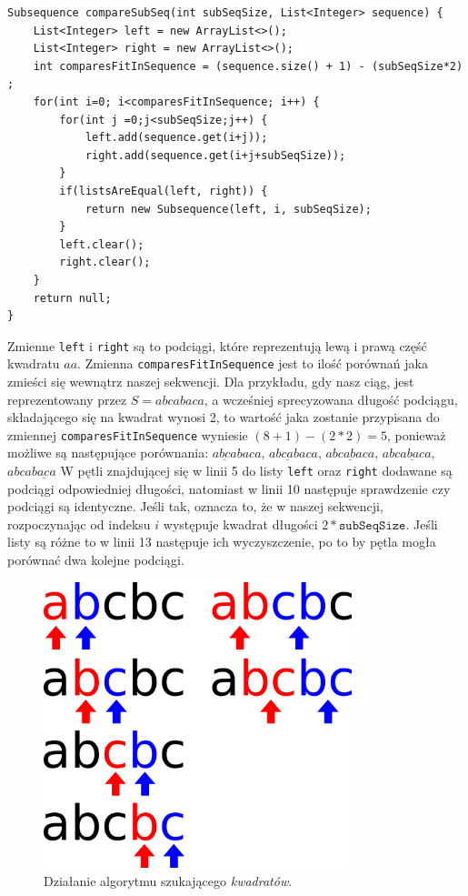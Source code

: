 \documentclass[document]{xmgr}
\begin{document}
\begin{lstlisting}[frame=single]
Subsequence compareSubSeq(int subSeqSize, List<Integer> sequence) {
	List<Integer> left = new ArrayList<>();
	List<Integer> right = new ArrayList<>();
	int comparesFitInSequence = (sequence.size() + 1) - (subSeqSize*2) ;
	for(int i=0; i<comparesFitInSequence; i++) {
		for(int j =0;j<subSeqSize;j++) {
			left.add(sequence.get(i+j));
			right.add(sequence.get(i+j+subSeqSize));
		}
		if(listsAreEqual(left, right)) {
			return new Subsequence(left, i, subSeqSize);
		}
		left.clear();
		right.clear();
	}
	return null;
}
\end{lstlisting}
Zmienne \texttt{left} i \texttt{right} są to podciągi, które reprezentują lewą i prawą część kwadratu $aa$. Zmienna \texttt{comparesFitInSequence} jest to ilość porównań jaka zmieści się wewnątrz naszej sekwencji. Dla przykładu, gdy nasz ciąg, jest reprezentowany przez $S = abcabaca$, a wcześniej sprecyzowana długość podciągu, składającego się na kwadrat wynosi 2, to wartość jaka zostanie przypisana do zmiennej \mbox{\texttt{comparesFitInSequence}} wyniesie $(8 + 1) - (2 * 2)=5$, ponieważ możliwe są następujące porównania: $\underline{abca}baca$, $a\underline{bcab}aca$, $ab\underline{caba}ca$, $abc\underline{abac}a$, $abca\underline{baca}$
W pętli znajdującej się w linii 5 do listy \texttt{left} oraz \mbox{\texttt{right}} dodawane są podciągi odpowiedniej długości, natomiast w linii 10 następuje sprawdzenie czy podciągi są identyczne. Jeśli tak, oznacza to, że w naszej sekwencji, rozpoczynając od indeksu $i$ występuje kwadrat długości $2 * \texttt{subSeqSize}$. Jeśli listy są różne to w linii 13 następuje ich wyczyszczenie, po to by pętla mogła porównać dwa kolejne podciągi.

\begin{figure}[b]
    \centering
    \includegraphics[width = 0.8\textwidth]{images/squareFinding}
    \caption{Działanie algorytmu szukającego \emph{kwadratów}.}
    \label{fig:squareFinding}
\end{figure}
\end{document}

